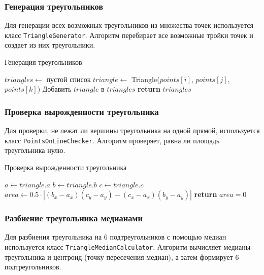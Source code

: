 \documentclass[a4paper,12pt]{article}
\begin{document}
\subsubsection{Генерация треугольников}

Для генерации всех возможных треугольников из множества точек используется класс \texttt{TriangleGenerator}. Алгоритм перебирает все возможные тройки точек и создает из них треугольники.

\begin{algorithm}
\caption{Генерация треугольников}
\begin{algorithmic}[1]
    \State $triangles \gets$ пустой список
                \State $triangle \gets$ Triangle($points[i]$, $points[j]$, $points[k]$)
                \State Добавить $triangle$ в $triangles$
            \EndFor
        \EndFor
    \EndFor
    \State \textbf{return} $triangles$
\EndProcedure
\end{algorithmic}
\end{algorithm}

\subsubsection{Проверка вырожденности треугольника}

Для проверки, не лежат ли вершины треугольника на одной прямой, используется класс \texttt{PointsOnLineChecker}. Алгоритм проверяет, равна ли площадь треугольника нулю.

\begin{algorithm}
\caption{Проверка вырожденности треугольника}
\begin{algorithmic}[1]
    \State $a \gets triangle.a$
    \State $b \gets triangle.b$
    \State $c \gets triangle.c$
    \State $area \gets 0.5 \cdot |(b_x - a_x)(c_y - a_y) - (c_x - a_x)(b_y - a_y)|$
    \State \textbf{return} $area = 0$
\EndProcedure
\end{algorithmic}
\end{algorithm}

\subsubsection{Разбиение треугольника медианами}

Для разбиения треугольника на 6 подтреугольников с помощью медиан используется класс \texttt{TriangleMedianCalculator}. Алгоритм вычисляет медианы треугольника и центроид (точку пересечения медиан), а затем формирует 6 подтреугольников.
\end{document}
